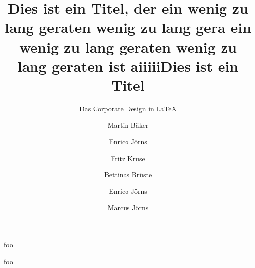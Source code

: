 \documentclass{beamer}
\begin{document}
\subtitle{Das Corporate Design in  LaTeX}
\title{Dies ist ein Titel, der ein wenig zu lang geraten  wenig zu lang gera ein wenig zu lang geraten  wenig zu lang geraten ist aiiiii}%
\title{Dies ist ein Titel}%
\author{Martin Bäker\and Enrico Jörns \and Fritz Kruse \and Bettinas Brüste}%
\author{Enrico Jörns \and Marcus Jörns}
\titlegraphic{\tuDefaultTitlegraphic}

\begin{frame}[plain]
  \titlepage
\end{frame}

\begin{frame}
  foo
\end{frame}

\begin{frame}
  foo
\end{frame}
\end{document}

